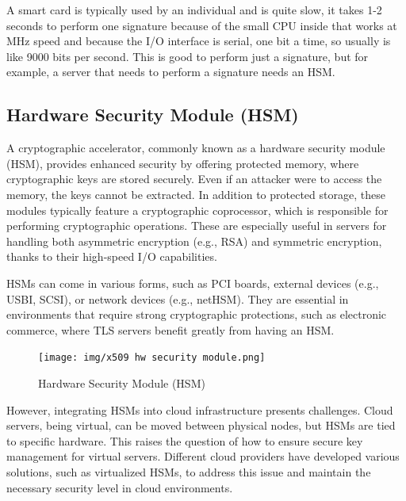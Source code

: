 A smart card is typically used by an individual and is quite slow, it
takes 1-2 seconds to perform one signature because of the small CPU
inside that works at MHz speed and because the I/O interface is
serial, one bit a time, so usually is like 9000 bits per second. This
is good to perform just a signature, but for example, a server that
needs to perform a signature needs an HSM.
\subsection{Hardware Security Module (HSM)}
A cryptographic accelerator, commonly known as a hardware security
module (HSM), provides enhanced security by offering protected memory,
where cryptographic keys are stored securely. Even if an attacker were
to access the memory, the keys cannot be extracted. In addition to
protected storage, these modules typically feature a cryptographic
coprocessor, which is responsible for performing cryptographic
operations. These are especially useful in servers for handling both
asymmetric encryption (e.g., RSA) and symmetric encryption, thanks to
their high-speed I/O capabilities.

HSMs can come in various forms, such as PCI boards, external devices
(e.g., USBI, SCSI), or network devices (e.g., netHSM). They are
essential in environments that require strong cryptographic
protections, such as electronic commerce, where TLS servers benefit
greatly from having an HSM.

\begin{figure}[H]
  \centering
  \texttt{[image: img/x509 hw security
  module.png]}
  \label{fig:HSM}

  \caption{Hardware Security Module (HSM)}
\end{figure}

However, integrating HSMs into cloud infrastructure presents
challenges. Cloud servers, being virtual, can be moved between
physical nodes, but HSMs are tied to specific hardware. This raises
the question of how to ensure secure key management for virtual
servers. Different cloud providers have developed various solutions,
such as virtualized HSMs, to address this issue and maintain the
necessary security level in cloud environments.
